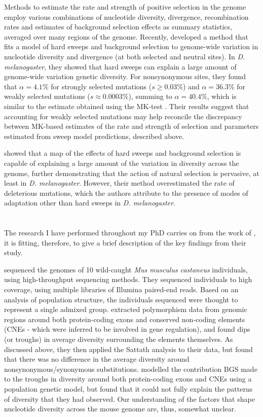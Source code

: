 	Methods to estimate the rate and strength of positive selection in the genome employ various combinations of nucleotide diversity, divergence, recombination rates and estimates of background selection effects as summary statistics, averaged over many regions of the genome. Recently, \cite{RN274} developed a method that fits a model of hard sweeps and background selection to genome-wide variation in nucleotide diversity and divergence (at both selected and neutral sites). In \textit{D. melanogaster}, they showed that hard sweeps can explain a large amount of genome-wide variation genetic diversity. For nonsynonymous sites, they found that $\alpha = 4.1\%$ for strongly selected mutations ($s \geq 0.03\%$) and $\alpha = 36.3\%$ for weakly selected mutations ($s \approx 0.0003\%$), summing to $\alpha = 40.4\%$, which is similar to the estimate obtained using the MK-test \citep{RN283}. Their results suggest that accounting for weakly selected mutations may help reconcile the discrepancy between MK-based estimates of the rate and strength of selection and parameters estimated from sweep model predictions, described above.

\cite{RN274} showed that a map of the effects of hard sweeps and background selection is capable of explaining a large amount of the variation in diversity across the genome, further demonstrating that the action of natural selection is pervasive, at least in \textit{D. melanogaster}. However, their method overestimated the rate of deleterious mutations, which the authors attribute to the presence of modes of adaptation other than hard sweeps in \textit{D. melanogaster}. 

\section[\citealt{RN122}]{\citealt{RN122}}


	The research I have performed throughout my PhD carries on from the work of \cite{RN122}, it is fitting, therefore, to give a brief description of the key findings from their study.
	
	\cite{RN122} sequenced the genomes of 10 wild-caught \textit{Mus musculus castaneus} individuals, using high-throughput sequencing methods. They sequenced individuals to high coverage, using multiple libraries of Illumina paired-end reads. Based on an analysis of population structure, the individuals sequenced were thought to represent a single admixed group. \cite{RN122} extracted polymorphism data from genomic regions around both protein-coding exons and conserved non-coding elements (CNEs - which were inferred to be involved in gene regulation), and found dips (or troughs) in average diversity surrounding the elements themselves. As discussed above, they then applied the Sattath analysis to their data, but found that there was no difference in the average diversity around nonsynonymous/synonymous substitutions. \cite{RN122} modelled the contribution BGS made to the troughs in diversity around both protein-coding exons and CNEs using a population genetic model, but found that it could not fully explain the patterns of diversity that they had observed. Our understanding of the factors that shape nucleotide diversity across the mouse genome are, thus, somewhat unclear.

